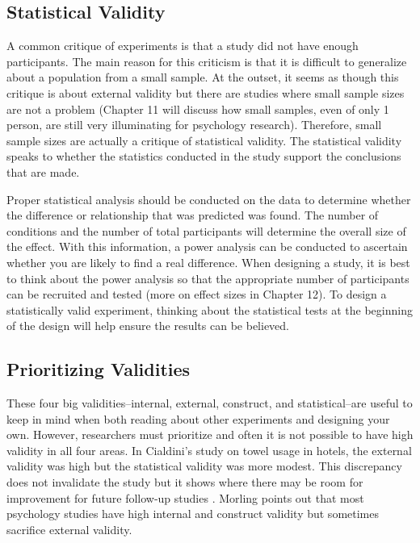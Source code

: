 \subsection{Statistical Validity}
 
A common critique of experiments is that a study did not have enough participants. The main reason for this criticism is that it is difficult to generalize about a population from a small sample. At the outset, it seems as though this critique is about external validity but there are studies where small sample sizes are not a problem (Chapter 11 will discuss how small samples, even of only 1 person, are still very illuminating for psychology research). Therefore, small sample sizes are actually a critique of statistical validity. The statistical validity speaks to whether the statistics conducted in the study support the conclusions that are made.
 
Proper statistical analysis should be conducted on the data to determine whether the difference or relationship that was predicted was found. The number of conditions and the number of total participants will determine the overall size of the effect. With this information, a power analysis can be conducted to ascertain whether you are likely to find a real difference. When designing a study, it is best to think about the power analysis so that the appropriate number of participants can be recruited and tested (more on effect sizes in Chapter 12). To design a statistically valid experiment, thinking about the statistical tests at the beginning of the design will help ensure the results can be believed.
 
\subsection{Prioritizing Validities}
 
These four big validities–internal, external, construct, and statistical–are useful to keep in mind when both reading about other experiments and designing your own. However, researchers must prioritize and often it is not possible to have high validity in all four areas. In Cialdini's study on towel usage in hotels, the external validity was high but the statistical validity was more modest. This discrepancy does not invalidate the study but it shows where there may be room for improvement for future follow-up studies \citep{goldstein_room_2008}. Morling \citeyear{morling_guide_2014} points out that most psychology studies have high internal and construct validity but sometimes sacrifice external validity.
 
